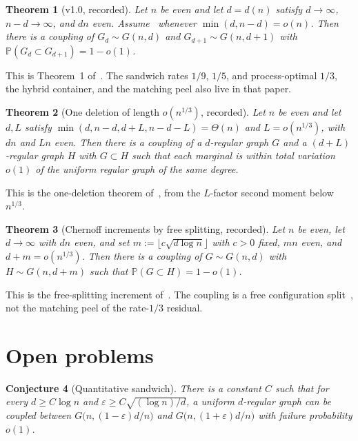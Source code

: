 \documentclass[11pt]{article}
\newtheorem{theorem}{Theorem}
\newtheorem{conjecture}[theorem]{Conjecture}
\newcommand{\Gnd}{G(n,d)}
\newcommand{\PP}{\mathbb{P}}
\begin{document}
\begin{theorem}[v1.0, recorded]
\label{thm:plus-one-recorded}
Let \(n\) be even and let \(d=d(n)\) satisfy \(d\to\infty\), \(n-d\to\infty\), and \(dn\) even.
Assume~\cite[Theorem~6]{Gao20} whenever \(\min(d,n-d)=o(n)\).
Then there is a coupling of \(G_d\sim\Gnd\) and \(G_{d+1}\sim G(n,d+1)\) with
\(\PP(G_d\subset G_{d+1})=1-o(1)\).
\end{theorem}

This is Theorem~1 of~\cite{PlusOneV1}.
The sandwich rates \(1/9\), \(1/5\), and process-optimal \(1/3\), the hybrid
container, and the matching peel also live in that paper.

\begin{theorem}[One deletion of length \(o(n^{1/3})\), recorded]
\label{thm:third-step-recorded}
Let \(n\) be even and let \(d,L\) satisfy \(\min(d,n-d,d+L,n-d-L)=\Theta(n)\) and
\(L=o(n^{1/3})\), with \(dn\) and \(Ln\) even.
Then there is a coupling of a \(d\)-regular graph \(G\) and a \((d+L)\)-regular
graph \(H\) with \(G\subset H\) such that each marginal is within total variation
\(o(1)\) of the uniform regular graph of the same degree.
\end{theorem}

This is the one-deletion theorem of~\cite{PlusOneV1}, from the \(L\)-factor
second moment below \(n^{1/3}\).

\begin{theorem}[Chernoff increments by free splitting, recorded]
\label{thm:free-chernoff-recorded}
Let \(n\) be even, let \(d\to\infty\) with \(dn\) even, and set
\(m:=\lfloor c\sqrt{d\log n}\rfloor\) with \(c>0\) fixed, \(mn\) even, and
\(d+m=o(n^{1/3})\).
Then there is a coupling of \(G\sim\Gnd\) with \(H\sim G(n,d+m)\) such that
\(\PP(G\subset H)=1-o(1)\).
\end{theorem}

This is the free-splitting increment of~\cite{PlusOneV1}.
The coupling is a free configuration split~\cite{Wormald99,JLR00}, not the
matching peel of the rate-\(1/3\) residual.

\section{Open problems}

\begin{conjecture}[Quantitative sandwich]
\label{conj:Q}
There is a constant \(C\) such that for every \(d\ge C\log n\) and
\(\varepsilon\ge C\sqrt{(\log n)/d}\), a uniform \(d\)-regular graph can be coupled
between \(G\bigl(n,(1-\varepsilon)d/n\bigr)\) and \(G\bigl(n,(1+\varepsilon)d/n\bigr)\)
with failure probability \(o(1)\).
\end{conjecture}
\end{document}
